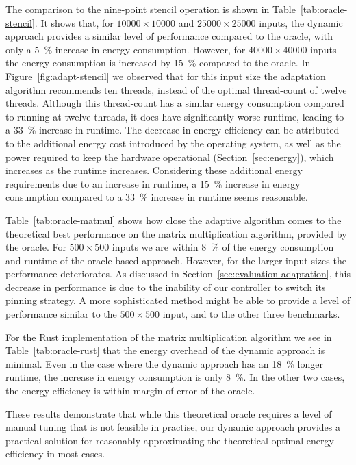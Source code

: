 \documentclass[runningheads]{llncs}
\begin{document}
The comparison to the nine-point stencil operation is shown in Table~\ref{tab:oracle-stencil}.
It shows that, for $10000 \times 10000$ and $25000 \times 25000$ inputs, the dynamic approach provides a similar level of performance compared to the oracle, with only a \qty{5}{\percent} increase in energy consumption.
However, for $40000 \times 40000$ inputs the energy consumption is increased by \qty{15}{\percent} compared to the oracle.
In Figure~\ref{fig:adapt-stencil} we observed that for this input size the adaptation algorithm recommends ten threads, instead of the optimal thread-count of twelve threads.
Although this thread-count has a similar energy consumption compared to running at twelve threads, it does have significantly worse runtime, leading to a \qty{33}{\percent} increase in runtime.
The decrease in energy-efficiency can be attributed to the additional energy cost introduced by the operating system, as well as the power required to keep the hardware operational (Section~\ref{sec:energy}), which increases as the runtime increases.
Considering these additional energy requirements due to an increase in runtime, a \qty{15}{\percent} increase in energy consumption compared to a \qty{33}{\percent} increase in runtime seems reasonable.

Table~\ref{tab:oracle-matmul} shows how close the adaptive algorithm comes to the theoretical best performance on the matrix multiplication algorithm, provided by the oracle.
For $500 \times 500$ inputs we are within \qty{8}{\percent} of the energy consumption and runtime of the oracle-based approach.
However, for the larger input sizes the performance deteriorates.
As discussed in Section~\ref{sec:evaluation-adaptation}, this decrease in performance is due to the inability of our controller to switch its pinning strategy.
A more sophisticated method might be able to provide a level of performance similar to the $500 \times 500$ input, and to the other three benchmarks.

For the Rust implementation of the matrix multiplication algorithm we see in Table~\ref{tab:oracle-rust} that the energy overhead of the dynamic approach is minimal.
Even in the case where the dynamic approach has an \qty{18}{\percent} longer runtime, the increase in energy consumption is only \qty{8}{\percent}.
In the other two cases, the energy-efficiency is within margin of error of the oracle.

These results demonstrate that while this theoretical oracle requires a level of manual tuning that is not feasible in practise, our dynamic approach provides a practical solution for reasonably approximating the theoretical optimal energy-efficiency in most cases.
\end{document}
